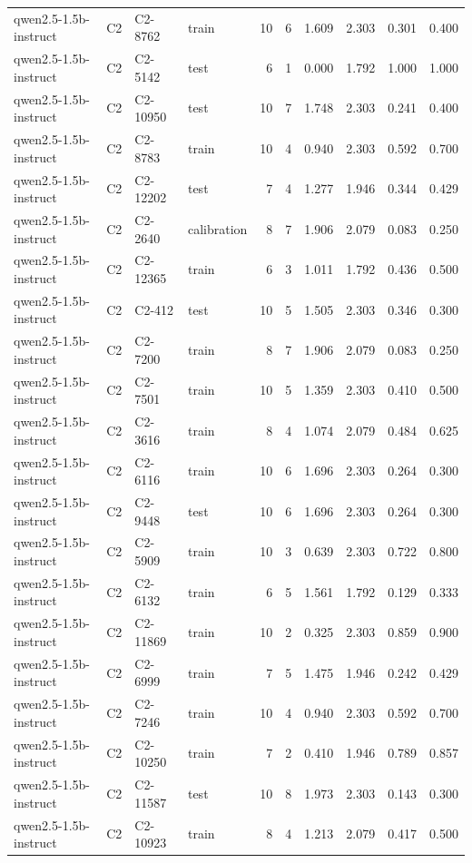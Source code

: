 \begin{table}
\begin{tabular}{llllrrrrrr}
qwen2.5-1.5b-instruct & C2 & C2-8762 & train & 10 & 6 & 1.609 & 2.303 & 0.301 & 0.400 \\
qwen2.5-1.5b-instruct & C2 & C2-5142 & test & 6 & 1 & 0.000 & 1.792 & 1.000 & 1.000 \\
qwen2.5-1.5b-instruct & C2 & C2-10950 & test & 10 & 7 & 1.748 & 2.303 & 0.241 & 0.400 \\
qwen2.5-1.5b-instruct & C2 & C2-8783 & train & 10 & 4 & 0.940 & 2.303 & 0.592 & 0.700 \\
qwen2.5-1.5b-instruct & C2 & C2-12202 & test & 7 & 4 & 1.277 & 1.946 & 0.344 & 0.429 \\
qwen2.5-1.5b-instruct & C2 & C2-2640 & calibration & 8 & 7 & 1.906 & 2.079 & 0.083 & 0.250 \\
qwen2.5-1.5b-instruct & C2 & C2-12365 & train & 6 & 3 & 1.011 & 1.792 & 0.436 & 0.500 \\
qwen2.5-1.5b-instruct & C2 & C2-412 & test & 10 & 5 & 1.505 & 2.303 & 0.346 & 0.300 \\
qwen2.5-1.5b-instruct & C2 & C2-7200 & train & 8 & 7 & 1.906 & 2.079 & 0.083 & 0.250 \\
qwen2.5-1.5b-instruct & C2 & C2-7501 & train & 10 & 5 & 1.359 & 2.303 & 0.410 & 0.500 \\
qwen2.5-1.5b-instruct & C2 & C2-3616 & train & 8 & 4 & 1.074 & 2.079 & 0.484 & 0.625 \\
qwen2.5-1.5b-instruct & C2 & C2-6116 & train & 10 & 6 & 1.696 & 2.303 & 0.264 & 0.300 \\
qwen2.5-1.5b-instruct & C2 & C2-9448 & test & 10 & 6 & 1.696 & 2.303 & 0.264 & 0.300 \\
qwen2.5-1.5b-instruct & C2 & C2-5909 & train & 10 & 3 & 0.639 & 2.303 & 0.722 & 0.800 \\
qwen2.5-1.5b-instruct & C2 & C2-6132 & train & 6 & 5 & 1.561 & 1.792 & 0.129 & 0.333 \\
qwen2.5-1.5b-instruct & C2 & C2-11869 & train & 10 & 2 & 0.325 & 2.303 & 0.859 & 0.900 \\
qwen2.5-1.5b-instruct & C2 & C2-6999 & train & 7 & 5 & 1.475 & 1.946 & 0.242 & 0.429 \\
qwen2.5-1.5b-instruct & C2 & C2-7246 & train & 10 & 4 & 0.940 & 2.303 & 0.592 & 0.700 \\
qwen2.5-1.5b-instruct & C2 & C2-10250 & train & 7 & 2 & 0.410 & 1.946 & 0.789 & 0.857 \\
qwen2.5-1.5b-instruct & C2 & C2-11587 & test & 10 & 8 & 1.973 & 2.303 & 0.143 & 0.300 \\
qwen2.5-1.5b-instruct & C2 & C2-10923 & train & 8 & 4 & 1.213 & 2.079 & 0.417 & 0.500 \\

\end{tabular}
\end{table}
